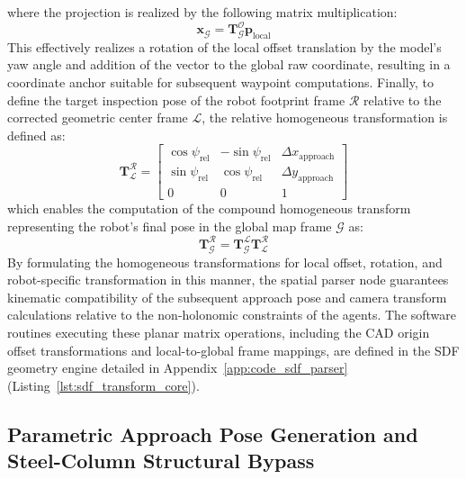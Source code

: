 where the projection is realized by the following matrix multiplication:
\begin{equation}
\mathbf{x}_{\mathcal{G}} = \mathbf{T}_{\mathcal{G}}^{\mathcal{O}} \mathbf{p}_{\text{local}} \label{eq:homogeneous_offset_projection}
\end{equation}
This effectively realizes a rotation of the local offset translation by the model's yaw angle and addition of the vector to the global raw coordinate, resulting in a coordinate anchor suitable for subsequent waypoint computations. Finally, to define the target inspection pose of the robot footprint frame $\mathcal{R}$ relative to the corrected geometric center frame $\mathcal{L}$, the relative homogeneous transformation is defined as:
\begin{equation}
\mathbf{T}_{\mathcal{L}}^{\mathcal{R}} = \begin{bmatrix} \cos\psi_{\text{rel}} & -\sin\psi_{\text{rel}} & \Delta x_{\text{approach}} \\ \sin\psi_{\text{rel}} & \cos\psi_{\text{rel}} & \Delta y_{\text{approach}} \\ 0 & 0 & 1 \end{bmatrix} \label{eq:homogeneous_relative_transform}
\end{equation}
which enables the computation of the compound homogeneous transform representing the robot's final pose in the global map frame $\mathcal{G}$ as:
\begin{equation}
\mathbf{T}_{\mathcal{G}}^{\mathcal{R}} = \mathbf{T}_{\mathcal{G}}^{\mathcal{L}} \mathbf{T}_{\mathcal{L}}^{\mathcal{R}} \label{eq:homogeneous_matrix_chain}
\end{equation}
By formulating the homogeneous transformations for local offset, rotation, and robot-specific transformation in this manner, the spatial parser node guarantees kinematic compatibility of the subsequent approach pose and camera transform calculations relative to the non-holonomic constraints of the agents. The software routines executing these planar matrix operations, including the CAD origin offset transformations and local-to-global frame mappings, are defined in the SDF geometry engine detailed in Appendix~\ref{app:code_sdf_parser} (Listing~\ref{lst:sdf_transform_core}).

\subsection{Parametric Approach Pose Generation and Steel-Column Structural Bypass}\label{sec:ch5_steel_bypass}

